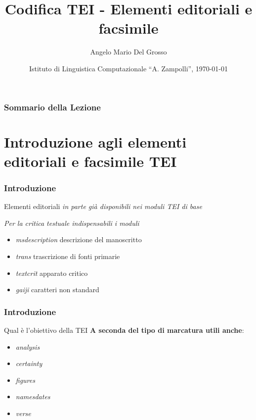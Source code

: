 \documentclass{beamer}
\title{Codifica TEI - Elementi editoriali e facsimile}
\author[A.M. Del Grosso]{Angelo Mario Del Grosso}
\institute{\texttt{angelo.delgrosso@ilc.cnr.it} \\\bigskip\textit{CNR-ILC-LicoLab} \\\bigskip\url{http://licolab.ilc.cnr.it/}}
\date{Istituto di Linguistica Computazionale ``A. Zampolli'', \today}
\begin{document}
    
    \begin{frame}
        \maketitle
    \end{frame}
    
    \begin{frame}
        \frametitle{Sommario della Lezione}
        \tableofcontents
    \end{frame}
    
    \section{Introduzione agli elementi editoriali e facsimile TEI}
    
    \begin{frame}
        \frametitle{Introduzione}
        \addtocounter{nframe}{1}
        
    
        \begin{block}{Elementi editoriali}
            \emph{in parte già disponibili nei moduli TEI di base}
            
            \textit{Per la critica testuale indispensabili i moduli}
            \begin{itemize}
                \item \emph{msdescription} descrizione del manoscritto 
                \item \emph{trans} trascrizione di fonti primarie 
                \item \emph{textcrit} apparato critico
                \item \emph{gaiji} caratteri non standard
            \end{itemize}
        \end{block}
        
    \end{frame}
    
    \begin{frame}
        \frametitle{Introduzione}
        \addtocounter{nframe}{1}
        
        \begin{block}{Qual è l'obiettivo della TEI}
           \textbf{ A seconda del tipo di marcatura utili anche}: 
           \begin{itemize}
               \item \emph{analysis}
               \item \emph{certainty}
               \item \emph{figures}
               \item \emph{namesdates}
               \item \emph{verse}
           \end{itemize}
        \end{block}
        
    \end{frame}
    
\end{document}
